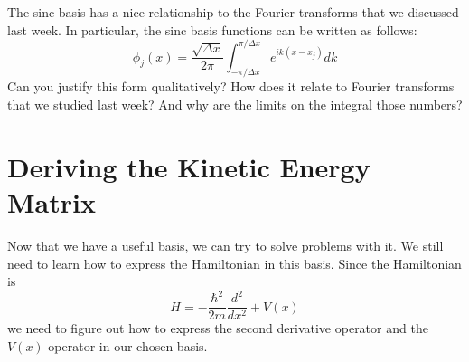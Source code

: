 \documentclass[letterpaper,10pt,english]{jupyterBook}
\begin{document}
\sphinxAtStartPar
The sinc basis has a nice relationship to the Fourier transforms that we discussed last week. In particular, the sinc basis functions can be written as follows:
\label{equation:Section4_v2:d3dacc37-bf49-4940-b87e-4f874a515e74}\begin{equation}
\phi_j(x) = \frac{\sqrt{\Delta x}}{2\pi} \int_{-\pi/\Delta x}^{\pi/\Delta x} e^{i k(x-x_j)} dk
\end{equation}
\sphinxAtStartPar
{} Can you justify this form qualitatively? How does it relate to Fourier transforms that we studied last week? And why are the limits on the integral those numbers?


\section{Deriving the Kinetic Energy Matrix}
\label{\detokenize{Section4_v2:deriving-the-kinetic-energy-matrix}}
\sphinxAtStartPar
Now that we have a useful basis, we can try to solve problems with it. We still need to learn how to express the Hamiltonian in this basis. Since the Hamiltonian is
\label{equation:Section4_v2:641be3c5-a365-47e4-a699-7b6c5e768aca}\begin{equation}
H = -\frac{\hbar^2}{2m} \frac{d^2}{dx^2} + V(x)
\end{equation}
\sphinxAtStartPar
we need to figure out how to express the second derivative operator and the \(V(x)\) operator in our chosen basis.
\end{document}
